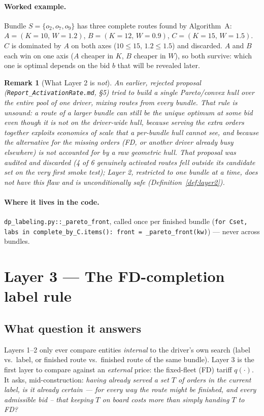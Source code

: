 \documentclass[11pt]{article}
\newtheorem{remark}{Remark}
\begin{document}
\paragraph{Worked example.} Bundle $S=\{o_2,o_7,o_9\}$ has three complete routes found by
Algorithm~A: $A=(K{=}10,\,W{=}1.2)$, $B=(K{=}12,\,W{=}0.9)$, $C=(K{=}15,\,W{=}1.5)$. $C$ is
dominated by $A$ on both axes ($10\le15$, $1.2\le1.5$) and discarded. $A$ and $B$ each win on
one axis ($A$ cheaper in $K$, $B$ cheaper in $W$), so both survive: which one is optimal
depends on the bid $b$ that will be revealed later.

\begin{remark}[What Layer 2 is \emph{not}]\label{rem:hull-rejected}
An earlier, rejected proposal (\texttt{Report\_ActivationRate.md}, \S5) tried to build a
\emph{single} Pareto/convex hull over the \emph{entire} pool of one driver, mixing routes from
every bundle. That rule is unsound: a route of a larger bundle can still be the unique optimum
at some bid even though it is not on the driver-wide hull, because serving the extra orders
\emph{together} exploits economies of scale that a per-bundle hull cannot see, and because the
alternative for the missing orders (FD, or another driver already busy elsewhere) is not
accounted for by a raw geometric hull. That proposal was audited and discarded (4 of 6
genuinely activated routes fell outside its candidate set on the very first smoke test); Layer
2, restricted to \emph{one bundle at a time}, does not have this flaw and is unconditionally
safe (Definition~\ref{def:layer2}).
\end{remark}

\paragraph{Where it lives in the code.} \texttt{dp\_labeling.py::\_pareto\_front}, called once
per finished bundle (\texttt{for Cset, labs in complete\_by\_C.items(): front =
\_pareto\_front(kw)}) --- never across bundles.

\section{Layer 3 --- The FD-completion label rule}

\subsection{What question it answers}
Layers 1--2 only ever compare entities \emph{internal} to the driver's own search (label vs.\
label, or finished route vs.\ finished route of the same bundle). Layer 3 is the first layer
to compare against an \emph{external} price: the fixed-fleet (FD) tariff $q(\cdot)$. It asks,
mid-construction: \emph{having already served a set $T$ of orders in the current label, is it
already certain --- for every way the route might be finished, and every admissible bid --
that keeping $T$ on board costs more than simply handing $T$ to FD?}
\end{document}
